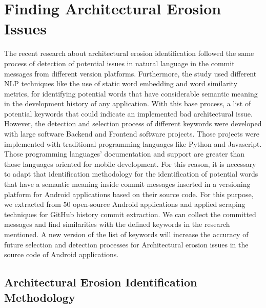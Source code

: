 \chapter{Finding Architectural Erosion Issues}
\label{cha:identification}

The recent research about architectural erosion identification followed the same process of detection of potential issues in natural language in the commit messages from different version platforms. Furthermore, the study used different NLP techniques like the use of static word embedding and word similarity metrics, for identifying potential words that have considerable semantic meaning in the development history of any application. With this base process, a list of potential keywords that could indicate an implemented bad architectural issue. However, the detection and selection process of different keywords were developed with large software Backend and Frontend software projects. Those projects were implemented with traditional programming languages like Python and Javascript. Those programming languages' documentation and support are greater than those languages oriented for mobile development. For this reason, it is necessary to adapt that identification methodology for the identification of potential words that have a semantic meaning inside commit messages inserted in a versioning platform for Android applications based on their source code. For this purpose, we extracted from 50 open-source Android applications and applied scraping techniques for GitHub history commit extraction. We can collect the committed messages and find similarities with the defined keywords in the research mentioned. A new version of the list of keywords will increase the accuracy of future selection and detection processes for Architectural erosion issues in the source code of Android applications.

\section{Architectural Erosion Identification Methodology}

